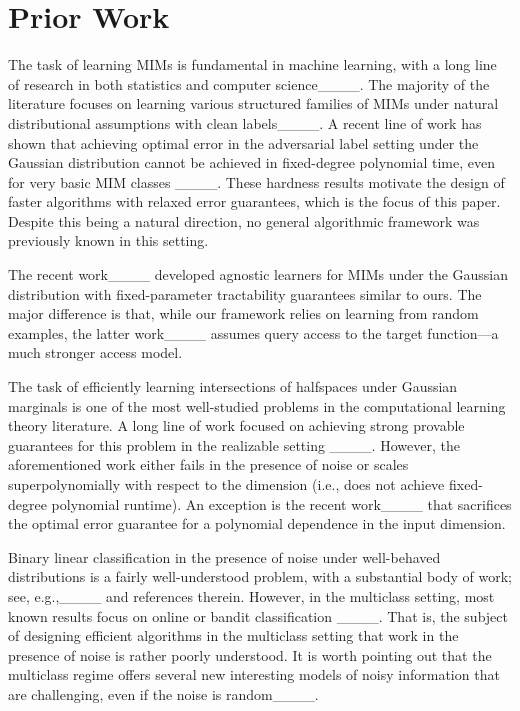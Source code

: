 \section{Prior Work}
The task of learning MIMs is fundamental in machine learning, 
with a long line of research in both statistics and computer 
science____.
The majority of the literature focuses on learning various structured families of MIMs under natural 
distributional assumptions with clean labels____.
A recent line of work has shown that 
achieving optimal error in the adversarial label setting 
under the Gaussian distribution cannot be achieved in fixed-degree
polynomial time, even for very basic MIM classes ____. These hardness results motivate the design of faster algorithms with relaxed error guarantees, which is the focus of this paper. Despite this being a natural direction, no general algorithmic framework was previously known in this setting.



The recent work____ developed 
agnostic learners for MIMs under the Gaussian distribution with 
fixed-parameter tractability 
guarantees similar to ours. The major difference is that, 
while our framework relies on learning from random examples, 
the latter work____ assumes query access to the target 
function---a much stronger access model.  

The task of efficiently learning intersections of halfspaces 
under Gaussian marginals is one of the most well-studied problems 
in the computational learning theory literature. A 
long line of work focused on achieving strong provable 
guarantees for this problem in the realizable setting ____. 
However, the aforementioned work either fails 
in the presence of noise or scales superpolynomially with respect to the dimension (i.e., does not achieve fixed-degree polynomial runtime). 
An exception is the recent work____ that 
sacrifices the optimal error guarantee for a polynomial dependence 
in the input dimension.

Binary linear classification in the presence of noise 
under well-behaved distributions is a fairly well-understood problem, 
with a substantial body of work; see, 
e.g.,____ and references therein. However, in the 
multiclass setting, most known results focus on online or bandit 
classification ____. That is, 
the subject of designing efficient algorithms in the multiclass setting 
that work in the presence of noise is rather poorly understood.
It is worth pointing out that the multiclass regime 
offers several new interesting models of noisy information that are 
challenging, even if the noise is random____.